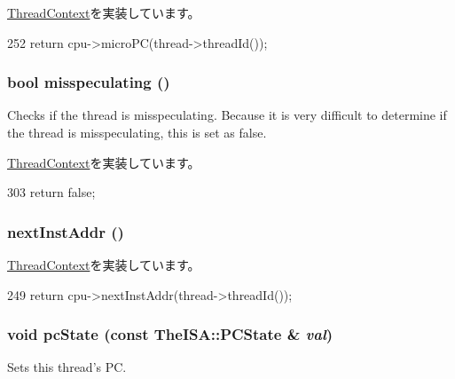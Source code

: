 \hyperlink{classThreadContext_a263dbcf93ece0a30ea54a77fdb2e3926}{ThreadContext}を実装しています。


\begin{DoxyCode}
252     { return cpu->microPC(thread->threadId()); }
\end{DoxyCode}
\hypertarget{classInOrderThreadContext_a99768639c728ee835cce54b8b42b3d8f}{
\subsubsection[{misspeculating}]{\setlength{\rightskip}{0pt plus 5cm}bool misspeculating ()}}
\label{classInOrderThreadContext_a99768639c728ee835cce54b8b42b3d8f}
Checks if the thread is misspeculating. Because it is very difficult to determine if the thread is misspeculating, this is set as false. 

\hyperlink{classThreadContext_a6b21c2b589ae3065643986e1c3e5f6fa}{ThreadContext}を実装しています。


\begin{DoxyCode}
303 { return false; }
\end{DoxyCode}
\hypertarget{classInOrderThreadContext_aceec6e28772f91b3cc921c0e3927b0c2}{
\subsubsection[{nextInstAddr}]{ nextInstAddr ()}}
\label{classInOrderThreadContext_aceec6e28772f91b3cc921c0e3927b0c2}


\hyperlink{classThreadContext_a01377ccfda419abf5f6ff7730c9eaac9}{ThreadContext}を実装しています。


\begin{DoxyCode}
249     { return cpu->nextInstAddr(thread->threadId()); }
\end{DoxyCode}
\hypertarget{classInOrderThreadContext_a5e9cfc754c9ef9b7db875ce89871944e}{
\subsubsection[{pcState}]{\setlength{\rightskip}{0pt plus 5cm}void pcState (const TheISA::PCState \& {\em val})}}
\label{classInOrderThreadContext_a5e9cfc754c9ef9b7db875ce89871944e}
Sets this thread's PC. 

